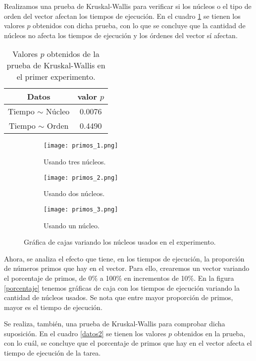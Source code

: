 \documentclass[12pt,letterpaper]{article}
\begin{document}
Realizamos una prueba de Kruskal-Wallis para verificar si los núcleos o el tipo de orden del vector afectan los tiempos de ejecución. En el cuadro \ref{datos1} se tienen los valores $p$ obtenidos con dicha prueba, con lo que se concluye que la cantidad de núcleos no afecta los tiempos de ejecución y los órdenes del vector sí afectan.
\begin{table}
\centering
\caption{Valores $p$ obtenidos de la prueba de Kruskal-Wallis en el primer experimento.}
\begin{tabular}{|c|c|}
\hline 
Datos & valor $p$ \\ 
\hline 
Tiempo $\sim$ Núcleo & 0.0076 \\ 
\hline 
Tiempo $\sim$ Orden & 0.4490 \\ 
\hline 
\end{tabular} 
\label{datos1}
\end{table}
\begin{figure}
 	\centering
 	\begin{subfigure}[b]{0.45\linewidth}
 		\texttt{[image: primos\_1.png]}
 		 \caption{Usando tres núcleos.}
 		\label{primos3}
 	\end{subfigure}
 	\begin{subfigure}[b]{0.45\linewidth}
 		\texttt{[image: primos\_2.png]}
 		 \caption{Usando dos núcleos.}
 		\label{primos2}
 	\end{subfigure}
 	\begin{subfigure}[b]{0.45\linewidth}
 		\texttt{[image: primos\_3.png]}
 		\caption{Usando un núcleo.}
 		\label{primos1}
 	\end{subfigure}
 	\caption{Gráfica de cajas variando los núcleos usados en el experimento.}  		
\label{primos}
 \end{figure}

Ahora, se analiza el efecto que tiene, en los tiempos de ejecución, la proporción de números primos que hay en el vector. Para ello, crearemos un vector variando el porcentaje de primos, de 0\% a 100\% en incrementos de 10\%. En la figura \ref{porcentaje} tenemos gráficas de caja con los tiempos de ejecución variando la cantidad de núcleos usados. Se nota que entre mayor proporción de primos, mayor es el tiempo de ejecución. 

Se realiza, también, una prueba de Kruskal-Wallis para comprobar dicha suposición. En el cuadro \ref{datos2} se tienen los valores $p$ obtenidos en la prueba, con lo cuál, se concluye que el porcentaje de primos que hay en el vector afecta el tiempo de ejecución de la tarea. 
\end{document}
